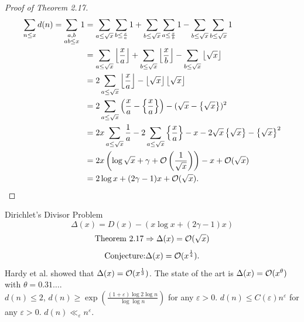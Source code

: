 \documentclass[twoside, openright, fontsize=10pt, headings=big]{scrbook}
\begin{document}
\begin{proof}[Proof of Theorem 2.17]
    \begin{align*}
        \sum_{n\leq x}d(n)=\sum_{\substack{a,b\\ ab\leq x}}1&=\sum_{a\leq \sqrt{x}}\sum_{b\leq \frac{x}{a}}1+\sum_{b\leq \sqrt{x}}\sum_{a\leq \frac{x}{b}}1-\sum_{b\leq \sqrt{x}}\sum_{b\leq \sqrt{x}}1\\
        &=\sum_{a\leq \sqrt{x}}\left\lfloor \frac{x}{a} \right\rfloor+\sum_{b\leq \sqrt{x}}\left\lfloor \frac{x}{b} \right\rfloor-\sum_{b\leq \sqrt{x}}\left\lfloor \sqrt{x} \right\rfloor\\
        &=2\sum_{a\leq \sqrt{x}}\left\lfloor \frac{x}{a} \right\rfloor-\left\lfloor \sqrt{x} \right\rfloor\left\lfloor \sqrt{x} \right\rfloor\\
        &=2\sum_{a\leq \sqrt{x}}\left(\frac{x}{a}-\left\{ \frac{x}{a} \right\}\right)-(\sqrt{x}-\left\{ \sqrt{x} \right\})^2\\
        &=2x\sum_{a\leq \sqrt{x}}\frac{1}{a}-2\sum_{a\leq \sqrt{x}}\left\{ \frac{x}{a} \right\}-x-2\sqrt{x}\left\{ \sqrt{x} \right\}-\left\{ \sqrt{x} \right\}^2\\
        &=2x\left(\log\sqrt{x}+\gamma+\mathcal{O}\left(\frac{1}{\sqrt{x}}\right)\right)-x+\mathcal{O}(\sqrt{x})\\
        &=2\log x+(2\gamma-1)x+\mathcal{O}(\sqrt{x}).\qedhere
    \end{align*}
\end{proof}
\begin{remark}
    Dirichlet's Divisor Problem\\
    \[
        \Delta(x)=D(x)-(x\log x+(2\gamma-1)x)\tag{$\ast$}
    \]
    \[
        \text{Theorem 2.17}\Rightarrow \Delta(x)=\mathcal{O}(\sqrt{x})
    \]
    \[
        \text{Conjecture:} \Delta(x)=\mathcal{O}(x^{\frac{1}{4}}).
    \]
    Hardy et al. showed that $\Delta(x)=\mathcal{O}(x^{\frac{1}{3}})$. The state of the art is $\Delta(x)=\mathcal{O}(x^\theta)$ with $\theta=0.31\dots$.\\
    $d(n)\leq2$, $d(n)\geq\exp\left(\frac{(1+\varepsilon)\log2\log n}{\log\log n}\right)$ for any $\varepsilon>0$. $d(n)\leq C(\varepsilon)n^\varepsilon$ for any $\varepsilon>0$. $d(n)\ll_\varepsilon n^\varepsilon$.
\end{remark}
\end{document}

